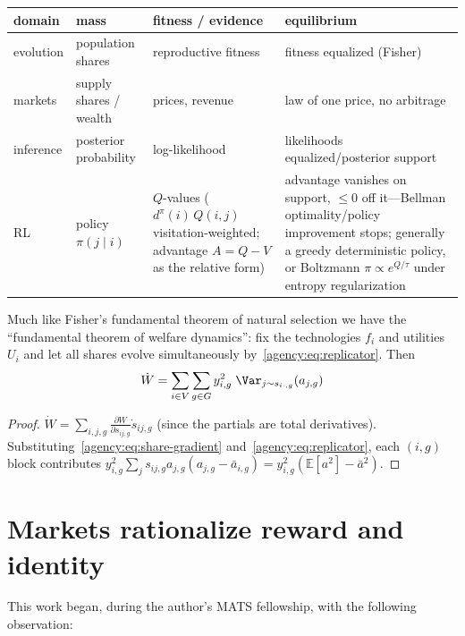 \begin{center}
\small
\begin{tabular}{@{}llp{4.2cm}p{5.2cm}@{}}
\toprule
domain & mass & fitness / evidence & equilibrium \\
\midrule
evolution & population shares      & reproductive fitness & fitness equalized (Fisher) \\
markets   & supply shares / wealth & prices, revenue      & law of one price, no arbitrage \\
inference & posterior probability  & log-likelihood       & likelihoods equalized/posterior support \\
RL        & policy $\pi(j \mid i)$ & $Q$-values ($d^\pi(i)\,Q(i,j)$ visitation-weighted; advantage $A = Q - V$ as the relative form) & advantage vanishes on support, $\le 0$ off it---Bellman optimality/policy improvement stops; generally a greedy deterministic policy, or Boltzmann $\pi \propto e^{Q/\tau}$ under entropy regularization \\
\bottomrule
\end{tabular}
\end{center}

Much like Fisher's fundamental theorem of natural selection we have the ``fundamental
theorem of welfare dynamics'': fix the technologies $f_i$ and utilities $U_i$ and let all
shares evolve simultaneously by~\eqref{agency:eq:replicator}. Then
\begin{equation}
\dot{W}
  = \sum_{i \in V} \sum_{g \in G} y_{i,g}^2\;
        \Var_{j \sim s_{i\cdot,g}}\!\left( a_{j,g} \right)\label{agency:eq:ftwd}
\end{equation}

\begin{proof}
$\dot W = \sum_{i,j,g} \frac{\partial W}{\partial s_{ij,g}} \dot s_{ij,g}$ (since the
partials are total derivatives). Substituting~\eqref{agency:eq:share-gradient}
and~\eqref{agency:eq:replicator}, each $(i,g)$ block contributes
$y_{i,g}^2 \sum_j s_{ij,g} a_{j,g}(a_{j,g} - \bar a_{i,g}) = y_{i,g}^2 (\mathbb{E}[a^2] - \bar a^2)$.
\end{proof}

\section{Markets rationalize reward and identity}\label{agency:sec:rationalize}

This work began, during the author's MATS fellowship, with the following observation:

